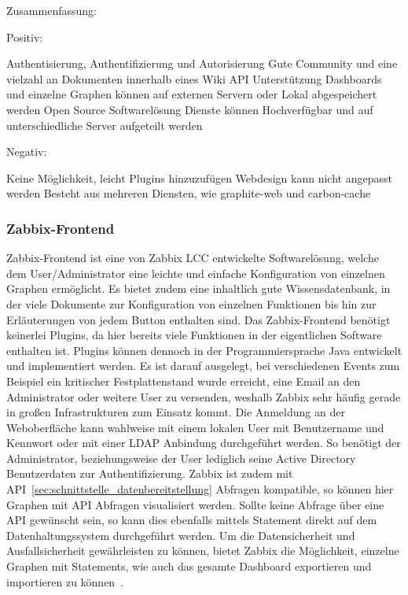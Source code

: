 Zusammenfassung:

Positiv:

\begin{outline}
  \1 Authentisierung, Authentifizierung und Autorisierung
  \1 Gute Community und eine vielzahl an Dokumenten innerhalb eines Wiki
  \1 API Unterstützung
  \1 Dashboards und einzelne Graphen können auf externen Servern oder Lokal
  abgespeichert werden
  \1 Open Source Softwarelösung
  \1 Dienste können Hochverfügbar und auf unterschiedliche Server aufgeteilt
  werden
\end{outline}

Negativ:

\begin{outline}
  \1 Keine Möglichkeit, leicht Plugins hinzuzufügen
  \1 Webdesign kann nicht angepasst werden
  \1 Besteht aus mehreren Diensten, wie graphite-web und carbon-cache
\end{outline}


\subsubsection{Zabbix-Frontend}
\label{subsubsec:zabbix-frontend}
Zabbix-Frontend ist eine von Zabbix LCC entwickelte Softwarelösung, welche dem
User/Administrator eine leichte und einfache Konfiguration von einzelnen
Graphen ermöglicht. Es bietet zudem eine inhaltlich gute Wissensdatenbank, in
der viele Dokumente zur Konfiguration von einzelnen Funktionen bis hin zur
Erläuterungen von jedem Button enthalten sind. Das Zabbix-Frontend benötigt
keinerlei Plugins, da hier bereits viele Funktionen in der eigentlichen
Software enthalten ist. Plugins können dennoch in der Programmiersprache Java
entwickelt und implementiert werden. Es ist darauf ausgelegt, bei verschiedenen
Events zum Beispiel ein kritischer Festplattenstand wurde erreicht, eine Email
an den Administrator oder weitere User zu versenden, weshalb Zabbix sehr häufig
gerade in großen Infrastrukturen zum Einsatz kommt. Die Anmeldung an der
Weboberfläche kann wahlweise mit einem lokalen User mit Benutzername und
Kennwort oder mit einer LDAP Anbindung durchgeführt werden. So benötigt der
Administrator, beziehungsweise der User lediglich seine Active Directory
Benutzerdaten zur Authentifizierung. Zabbix ist zudem mit
API~\ref{sec:schnittstelle_datenbereitstellung} Abfragen kompatible, so
können hier Graphen mit API Abfragen visualisiert werden. Sollte keine Abfrage
über eine API gewünscht sein, so kann dies ebenfalls mittels Statement direkt
auf dem Datenhaltungssystem durchgeführt werden. Um die Datensicherheit und
Ausfallsicherheit gewährleisten zu können, bietet Zabbix die Möglichkeit,
einzelne Graphen mit Statements, wie auch das gesamte Dashboard exportieren und
importieren zu können~\cite{zabbix-frontend}.


